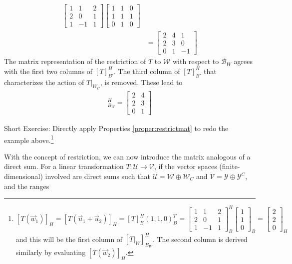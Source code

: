 \begin{solution}
\begin{align*}
\begin{bmatrix}
1 & 1 & 2 \\
2 & 0 & 1 \\
1 & -1 & 1
\end{bmatrix}
\begin{bmatrix}
1 & 1 & 0 \\
1 & 1 & 1 \\
0 & 1 & 0
\end{bmatrix} \\
&=
\begin{bmatrix}
2 & 4 & 1 \\
2 & 3 & 0 \\
0 & 1 & -1
\end{bmatrix}
\end{align*}
The matrix representation of the restriction of $T$ to $\mathcal{W}$ with respect to $\mathcal{B}_W$ agrees with the first two columns of $[T]_{B'}^H$. The third column of $[T]_{B'}^H$ that characterizes the action of $T|_{W_C}$, is removed. These lead to
\begin{align*}
[T|_W]_{B_W}^H =
\begin{bmatrix}
2 & 4 \\
2 & 3 \\
0 & 1 
\end{bmatrix}
\end{align*}
\end{solution}
Short Exercise: Directly apply Properties \ref{proper:restrictmat} to redo the example above.\footnote{$[T(\vec{w}_1)]_H = [T(\vec{u}_1+\vec{u}_2)]_H = [T]_B^H(1,1,0)_B^T =
\begin{bmatrix}
1 & 1 & 2 \\
2 & 0 & 1 \\
1 & -1 & 1
\end{bmatrix}_B^H
\begin{bmatrix}
1 \\
1 \\
0
\end{bmatrix}_B
= \begin{bmatrix}
2 \\
2 \\
0
\end{bmatrix}_H
$ and this will be the first column of $[T|_W]_{B_W}^H$. The second column is derived similarly by evaluating $[T(\vec{w}_2)]_H$.}\par
With the concept of restriction, we can now introduce the matrix analogous of a direct sum. For a linear transformation $T: \mathcal{U} \to \mathcal{V}$, if the vector spaces (finite-dimensional) involved are direct sums such that $\mathcal{U} = \mathcal{W} \oplus \mathcal{W}_C$ and $\mathcal{V} = \mathcal{Y} \oplus \mathcal{Y}^C$, and the ranges
